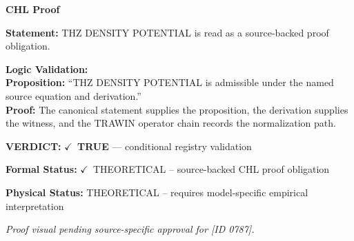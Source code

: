 \vspace{0.45em}
\noindent\textbf{CHL Proof}\par
\textbf{Statement:} THZ DENSITY POTENTIAL is read as a source-backed proof obligation.

\textbf{Logic Validation:}\\
\textbf{Proposition:} ``THZ DENSITY POTENTIAL is admissible under the named source equation and derivation.''\\
\textbf{Proof:} The canonical statement supplies the proposition, the derivation supplies the witness, and the TRAWIN operator chain records the normalization path.

\textbf{VERDICT:} \ensuremath{\checkmark}\ \textbf{TRUE} --- conditional registry validation

\textbf{Formal Status:} \ensuremath{\checkmark}\ THEORETICAL -- source-backed CHL proof obligation

\textbf{Physical Status:} THEORETICAL -- requires model-specific empirical interpretation
\par\vspace{0.45em}
\par
\vfill
\begingroup\footnotesize\itshape
Proof visual pending source-specific approval for [ID 0787].
\par\endgroup
\vfill
\endgroup
\endgroup
